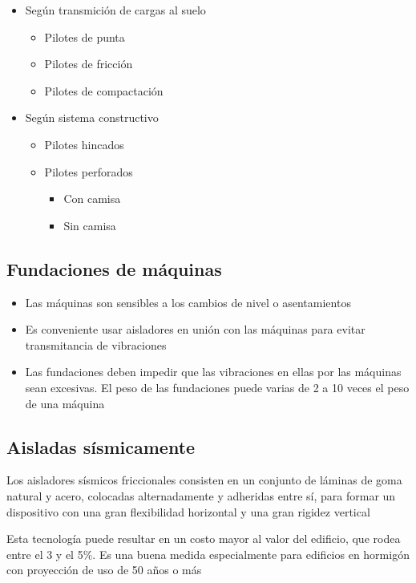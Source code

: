 \begin{itemize}
    \item Según transmición de cargas al suelo
    \begin{itemize}
        \item Pilotes de punta
        \item Pilotes de fricción
        \item Pilotes de compactación
    \end{itemize}
    \item Según sistema constructivo
    \begin{itemize}
        \item Pilotes hincados
        \item Pilotes perforados
        \begin{itemize}
            \item Con camisa
            \item Sin camisa
        \end{itemize}
    \end{itemize}
\end{itemize}

\subsection{Fundaciones de máquinas}
\begin{itemize}
    \item Las máquinas son sensibles a los cambios de nivel o asentamientos
    \item Es conveniente usar aisladores en unión con las máquinas para evitar transmitancia de vibraciones
    \item Las fundaciones deben impedir que las vibraciones en ellas por las máquinas sean excesivas. El peso de las fundaciones puede varias de 2 a 10 veces el peso de una máquina
\end{itemize}

\subsection{Aisladas sísmicamente}
Los aisladores sísmicos friccionales consisten en un conjunto de láminas de goma natural y acero, colocadas alternadamente y adheridas entre sí, para formar un dispositivo con una gran flexibilidad horizontal y una gran rigidez vertical 

Esta tecnología puede resultar en un costo mayor al valor del edificio, que rodea entre el 3 y el 5\%. Es una buena medida especialmente para edificios en hormigón con proyección de uso de 50 años o más